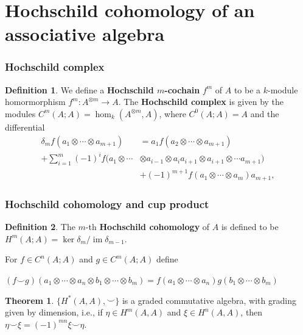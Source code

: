 \documentclass{beamer}
\theoremstyle{definition}
\newtheorem{teorema}{Theorem}
\newtheorem{defi}{Definition}
\DeclareMathOperator{\im}{im}
\begin{document}
\section{Hochschild cohomology of an associative algebra}
\begin{frame}
	\frametitle{Hochschild complex}
	\begin{defi}
	 We define a \textbf{Hochschild $m$-cochain} $f^m$ of $A$ to be a $k$-module homormorphism $f^m: A^{\otimes m}\to A$. The \textbf{Hochschild complex} is given by the modules $C^m(A;A)=\hom_k(A^{\otimes m}, A)$, where $C^0(A;A)=A$ and the differential
	 \begin{align*}
	 \delta_m f(a_1\otimes\cdots\otimes a_{m+1})&=a_1f(a_2\otimes\cdots\otimes a_{m+1})\\
	  +\sum_{i=1}^m(-1)^if(a_1\otimes\cdots&\otimes a_{i-1}\otimes a_ia_{i+1}\otimes a_{i+1}\otimes\cdots a_{m+1})\\
	 & +(-1)^{m+1}f(a_1\otimes\cdots\otimes a_m)a_{m+1},
	 \end{align*}
	 \end{defi}
\end{frame}

\begin{frame}
	\frametitle{Hochschild cohomology and cup product}
	\begin{defi}
		The $m$-th \textbf{Hochschild cohomology} of $A$ is defined to be $H^m(A;A)=\ker\delta_m/\im\delta_{m-1}$.
		\end{defi}\pause
		
		For $f\in C^n(A;A)$ and $g\in C^m(A;A)$ define
		
		 $(f\smile g)(a_1\otimes\cdots\otimes a_n\otimes b_1\otimes\cdots\otimes b_m)=f(a_1\otimes\cdots\otimes a_n)g(b_1\otimes\cdots\otimes b_m)$\pause
	\begin{teorema}
		$\{H^*(A,A),\smile\}$ is a graded commutative algebra, with grading given by dimension, i.e., if $\eta\in H^m(A,A)$ and $\xi\in H^n(A,A)$, then $\eta\smile \xi =(-1)^{mn}\xi\smile \eta$.
	\end{teorema} 
\end{frame}

%
%
\end{document}
